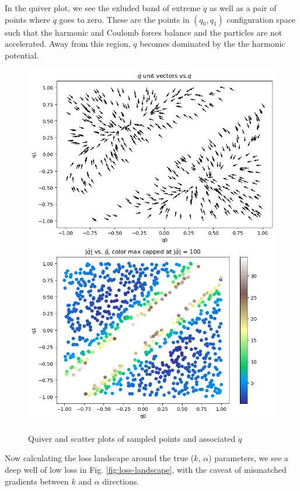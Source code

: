 \documentclass[]{article}
\begin{document}
In the quiver plot, we see the exluded band of extreme $\ddot{q}$ as well as a pair of points where $\ddot{q}$ goes to zero. These are the points in $(q_0,q_1)$ configuration space such that the harmonic and Coulomb forces balance and the particles are not accelerated.  Away from this region, $\ddot{q}$ becomes dominated by the the harmonic potential.
\begin{figure}[H]
	\caption{Quiver and scatter plots of sampled points and associated $\ddot{q}$}
	\centering
	\includegraphics[scale=0.35]{2D-sampling.png}
	\label{fig:quiver-sampling}
\end{figure}

Now calculating the loss landscape around the true ($k$, $\alpha$) parameters, we see a deep well of low loss in Fig. \ref{fig:loss-landscape}, with the caveat of mismatched gradients between $k$ and $\alpha$ directions.
\end{document}
